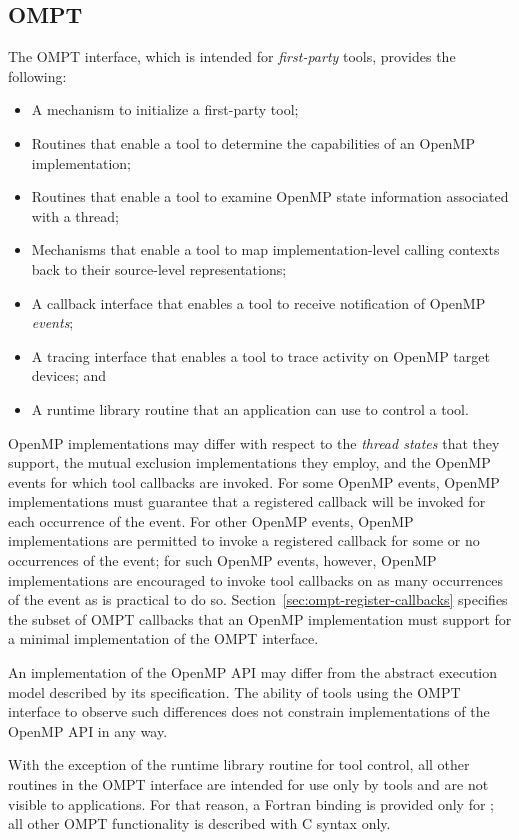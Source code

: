 \subsection{OMPT}

The OMPT interface, which is intended for \emph{first-party} tools,
provides the following:
\begin{itemize}
\item A mechanism to initialize a first-party tool;
\item Routines that enable a tool to determine the capabilities of an
      OpenMP implementation;
\item Routines that enable a tool to examine OpenMP state information 
      associated with a thread;
\item Mechanisms that enable a tool to map implementation-level calling
      contexts back to their source-level representations;
\item A callback interface that enables a tool to receive notification
      of OpenMP \emph{events};
\item A tracing interface that enables a tool to trace activity on OpenMP 
      target devices; and
\item A runtime library routine that an application can use to control a tool.
\end{itemize}

OpenMP implementations may differ with respect to the \emph{thread states} that
they support, the mutual exclusion implementations they employ,
and the OpenMP events for which tool callbacks are invoked. For some OpenMP events,
OpenMP implementations must guarantee that a registered callback will be invoked for each occurrence of the
event. For other OpenMP events, OpenMP implementations are permitted to invoke a registered callback for some
or no occurrences of the event; for such
OpenMP events, however,
OpenMP implementations are encouraged to invoke tool callbacks on as
many occurrences of the event as is practical to do so.
Section~\ref{sec:ompt-register-callbacks} specifies the subset of OMPT
callbacks that an OpenMP implementation must support for a minimal
implementation of the OMPT interface.

An implementation of the OpenMP API may differ from the
abstract execution model described by its specification.  The ability
of tools using the OMPT interface to observe such differences does not constrain
implementations of the OpenMP API in any way.

With the exception of the  runtime library routine for tool control,
all other routines in the OMPT interface are intended for use only by tools and
are not visible to applications.
For that reason, a Fortran binding is provided only
for ;
all other OMPT functionality is described with C syntax only.

